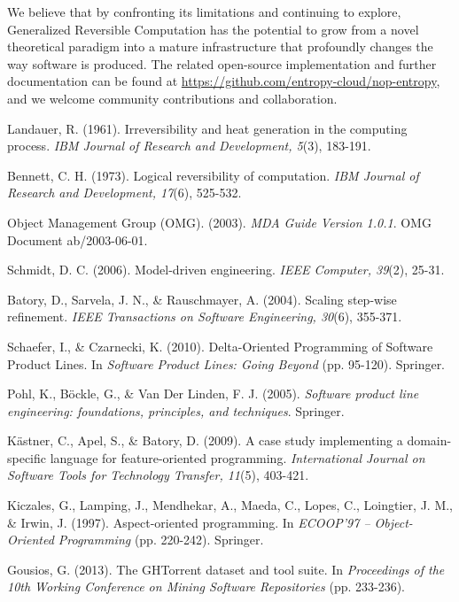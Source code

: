 \documentclass[11pt]{article}
\begin{document}
We believe that by confronting its limitations and continuing to explore, Generalized Reversible Computation has the potential to grow from a novel theoretical paradigm into a mature infrastructure that profoundly changes the way software is produced. The related open-source implementation and further documentation can be found at \url{https://github.com/entropy-cloud/nop-entropy}, and we welcome community contributions and collaboration.


\begin{thebibliography}{99}

Landauer, R. (1961). Irreversibility and heat generation in the computing process. \textit{IBM Journal of Research and Development, 5}(3), 183-191.

Bennett, C. H. (1973). Logical reversibility of computation. \textit{IBM Journal of Research and Development, 17}(6), 525-532.

Object Management Group (OMG). (2003). \textit{MDA Guide Version 1.0.1}. OMG Document ab/2003-06-01.

Schmidt, D. C. (2006). Model-driven engineering. \textit{IEEE Computer, 39}(2), 25-31.

Batory, D., Sarvela, J. N., \& Rauschmayer, A. (2004). Scaling step-wise refinement. \textit{IEEE Transactions on Software Engineering, 30}(6), 355-371.

Schaefer, I., \& Czarnecki, K. (2010). Delta-Oriented Programming of Software Product Lines. In \textit{Software Product Lines: Going Beyond} (pp. 95-120). Springer.

Pohl, K., Böckle, G., \& Van Der Linden, F. J. (2005). \textit{Software product line engineering: foundations, principles, and techniques}. Springer.

Kästner, C., Apel, S., \& Batory, D. (2009). A case study implementing a domain-specific language for feature-oriented programming. \textit{International Journal on Software Tools for Technology Transfer, 11}(5), 403-421.

Kiczales, G., Lamping, J., Mendhekar, A., Maeda, C., Lopes, C., Loingtier, J. M., \& Irwin, J. (1997). Aspect-oriented programming. In \textit{ECOOP'97 -- Object-Oriented Programming} (pp. 220-242). Springer.

Gousios, G. (2013). The GHTorrent dataset and tool suite. In \textit{Proceedings of the 10th Working Conference on Mining Software Repositories} (pp. 233-236).


\end{thebibliography}
\end{document}
